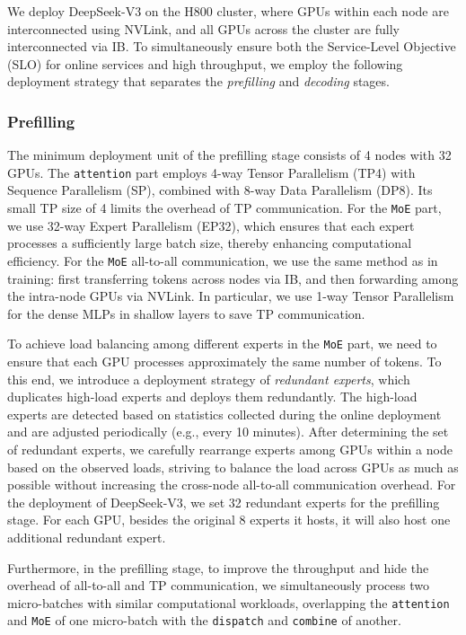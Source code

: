 \documentclass[11pt, a4paper, logo, copyright, nonumbering]{deepseek}
\newcommand{\dsviii}{DeepSeek-V3}
\begin{document}
\begin{CJK*}{UTF8}{gbsn}
We deploy \dsviii{} on the H800 cluster, where GPUs within each node are interconnected using NVLink, and all GPUs across the cluster are fully interconnected via IB. 
To simultaneously ensure both the Service-Level Objective (SLO) for online services and high throughput, we employ the following deployment strategy that separates the \textit{prefilling} and \textit{decoding} stages.

\subsubsection{Prefilling}

The minimum deployment unit of the prefilling stage consists of 4 nodes with 32 GPUs. 
The \texttt{attention} part employs 4-way Tensor Parallelism (TP4) with Sequence Parallelism (SP), combined with 8-way Data Parallelism (DP8).
Its small TP size of 4 limits the overhead of TP communication. 
For the \texttt{MoE} part, we use 32-way Expert Parallelism (EP32), which ensures that each expert processes a sufficiently large batch size, thereby enhancing computational efficiency. 
For the \texttt{MoE} all-to-all communication, we use the same method as in training: first transferring tokens across nodes via IB, and then forwarding among the intra-node GPUs via NVLink. 
In particular, we use 1-way Tensor Parallelism for the dense MLPs in shallow layers to save TP communication.

To achieve load balancing among different experts in the \texttt{MoE} part, we need to ensure that each GPU processes approximately the same number of tokens.  
To this end, we introduce a deployment strategy of \textit{redundant experts}, which duplicates high-load experts and deploys them redundantly. 
The high-load experts are detected based on statistics collected during the online deployment and are adjusted periodically (e.g., every 10 minutes). 
After determining the set of redundant experts, we carefully rearrange experts among GPUs within a node based on the observed loads, striving to balance the load across GPUs as much as possible without increasing the cross-node all-to-all communication overhead. 
For the deployment of \dsviii{}, we set 32 redundant experts for the prefilling stage. 
For each GPU, besides the original 8 experts it hosts, it will also host one additional redundant expert.

Furthermore, in the prefilling stage, to improve the throughput and hide the overhead of all-to-all and TP communication, we simultaneously process two micro-batches with similar computational workloads, overlapping the \texttt{attention} and \texttt{MoE} of one micro-batch with the \texttt{dispatch} and \texttt{combine} of another. 


\end{CJK*}
\end{document}
